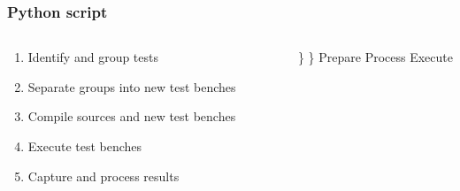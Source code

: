 \documentclass[british,10pt]{beamer}
\begin{document}
%



\begin{frame}\frametitle{Python script}
\begin{columns}
\begin{column}{0.60\textwidth}
\begin{enumerate}
\item Identify and group tests
\item Separate groups into new test benches
\item Compile sources and new test benches
\item Execute test benches
\item Capture and process results
\end{enumerate}
\end{column}
\vskip12pt
\Huge\}
\vskip1pt
\}
 Prepare
\vskip13pt
 Process
\vskip17pt
 Execute
\end{columns}
\end{frame}
\end{document}
